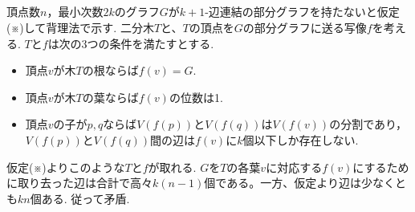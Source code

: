 \subsection{}
頂点数$n$，最小次数$2k$のグラフ$G$が$k+1$-辺連結の部分グラフを持たないと仮定(※)して背理法で示す.
二分木$T$と、$T$の頂点を$G$の部分グラフに送る写像$f$を考える.
$T$と$f$は次の3つの条件を満たすとする.
\begin{itemize}
 \item 頂点$v$が木$T$の根ならば$f(v)=G$.
 \item 頂点$v$が木$T$の葉ならば$f(v)$の位数は1.
 \item 頂点$v$の子が$p,q$ならば$V(f(p))$と$V(f(q))$は$V(f(v))$の分割であり，$V(f(p))$と$V(f(q))$間の辺は$f(v)$に$k$個以下しか存在しない.
\end{itemize}

仮定(※)よりこのような$T$と$f$が取れる. 
$G$を$T$の各葉$v$に対応する$f(v)$にするために取り去った辺は合計で高々$k(n-1)$個である。一方、仮定より辺は少なくとも$kn$個ある. 
従って矛盾. 

